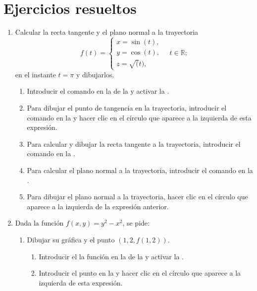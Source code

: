 \section{Ejercicios resueltos}
\begin{enumerate}[leftmargin=*]
\item Calcular la recta tangente y el plano normal a la trayectoria
      \[
      f(t)=
      \begin{cases}
      x=\sin(t), \\
      y=\cos(t), \\
      z=\sqrt(t),
      \end{cases}
      \quad t\in \mathbb{R};
      \]
      en el instante $t=\pi$ y dibujarlos.

      \begin{indication}
      \begin{enumerate}
      \item Introducir el comando  en la  de la  y activar la .
      \item Para dibujar el punto de tangencia en la trayectoria, introducir el comando  en la  y hacer clic en el círculo que aparece a la izquierda de esta expresión.
      \item Para calcular y dibujar la recta tangente a la trayectoria, introducir el comando  en la .
      \item Para calcular el plano normal a la trayectoria, introducir el comando  en la .
      \item Para dibujar el plano normal a la trayectoria, hacer clic en el círculo que aparece a la izquierda de la expresión anterior.
      \end{enumerate}
      \end{indication}

\item Dada la función $f(x,y)=y^2-x^2$, se pide:
      \begin{enumerate}
      \item Dibujar su gráfica y el punto $(1,2,f(1,2))$.
            \begin{indication}
            \begin{enumerate}
            \item Introducir el la función  en la  de la  y activar la .
            \item Introducir el punto  en la  y hacer clic en el círculo que aparece a la izquierda de esta expresión.
            \end{enumerate}


\end{indication}
\end{enumerate}
\end{enumerate}
